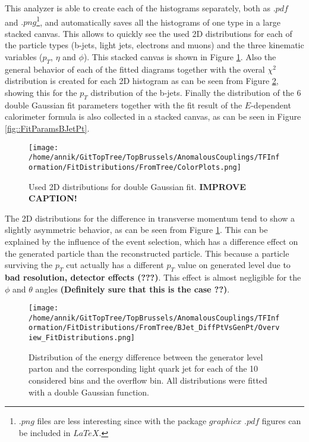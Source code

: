 This analyzer is able to create each of the histograms separately, both as $.pdf$ and $.png$\footnote{$.png$ files are less interesting since with the package $graphicx$ $.pdf$ figures can be included in $LaTeX$.}, and automatically saves all the histograms of one type in a large stacked canvas. This allows to quickly see the used 2D distributions for each of the particle types (b-jets, light jets, electrons and muons) and the three kinematic variables ($p_T$, $\eta$ and $\phi$). This stacked canvas is shown in Figure \ref{fig::ColorPlots}.  Also the general behavior of each of the fitted diagrams together with the overal $\chi^{2}$ distribution is created for each 2D histogram as can be seen from Figure \ref{fig::StackedHistoBJetPt}, showing this for the $p_T$ distribution of the b-jets. Finally the distribution of the $6$ double Gaussian fit parameters together with the fit result of the $E$-dependent calorimeter formula is also collected in a stacked canvas, as can be seen in Figure \ref{fig::FitParamsBJetPt}.
\begin{figure}[!h]
  \centering
  \texttt{[image: /home/annik/GitTopTree/TopBrussels/AnomalousCouplings/TFInformation/FitDistributions/FromTree/ColorPlots.png]}
  \caption{Used 2D distributions for double Gaussian fit. \textbf{IMPROVE CAPTION!}} \label{fig::ColorPlots} 
\end{figure}
The 2D distributions for the difference in transverse momentum tend to show a slightly asymmetric behavior, as can be seen from Figure \ref{fig::ColorPlots}. This can be explained by the influence of the event selection, which has a difference effect on the generated particle than the reconstructed particle. This because a particle surviving the $p_T$ cut actually has a different $p_T$ value on generated level due to \textbf{bad resolution, detector effects (???)}. This effect is almost negligible for the $\phi$ and $\theta$ angles \textbf{(Definitely sure that this is the case ??)}.
\begin{figure}[!h]
  \centering
  \texttt{[image: /home/annik/GitTopTree/TopBrussels/AnomalousCouplings/TFInformation/FitDistributions/FromTree/BJet\_DiffPtVsGenPt/Overview\_FitDistributions.png]}
  \caption{Distribution of the energy difference between the generator level parton and the corresponding light quark jet for each of the 10 considered bins and the overflow bin. All distributions were fitted with a double Gaussian function.} \label{fig::StackedHistoBJetPt}
\end{figure}

